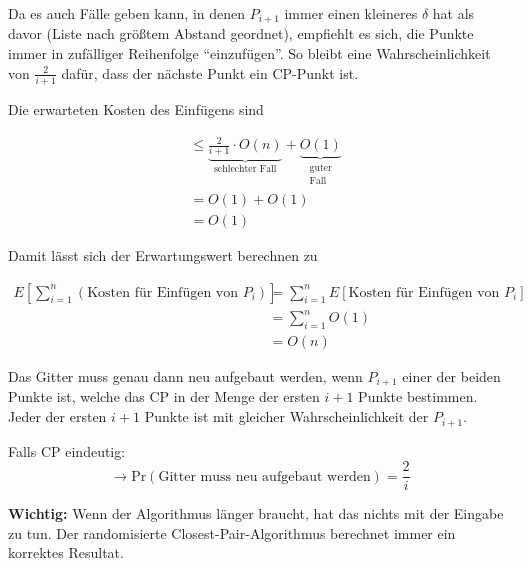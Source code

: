 \documentclass{scrartcl}%
\begin{document}
    Da es auch Fälle geben kann, in denen $P_{i+1}$ immer einen kleineres $\delta$ hat als davor
    (Liste nach größtem Abstand geordnet), empfiehlt es sich, die Punkte immer in zufälliger Reihenfolge "`einzufügen"'.
    So bleibt eine Wahrscheinlichkeit von $\frac{2}{i+1}$ dafür, dass der nächste Punkt ein CP-Punkt ist.

    Die erwarteten Kosten des Einfügens sind

    \begin{equation*}
        \begin{align*}
            & \leq \underbrace{\frac{2}{i+1} \cdot O(n)}_{\text{schlechter Fall}} + \underbrace{O(1)}_{\substack{\text{guter} \\ \text{Fall}}}\\\nonumber
            & = O(1) + O(1) \\\nonumber
            & = O(1)
        \end{align*}
    \end{equation*}

    \newpage
    Damit lässt sich der Erwartungswert berechnen zu

    \begin{equation*}
        \begin{align*}
            E\left[ \sum^{n}_{i=1}(\text{Kosten für Einfügen von }P_i)\right] &= \sum^{n}_{i=1}E[\text{Kosten für Einfügen von }P_i] \\\nonumber
            &= \sum^{n}_{i=1}O(1)\\\nonumber
            & = O(n)
        \end{align*}
    \end{equation*}

    {
    Das Gitter muss genau dann neu aufgebaut werden, wenn $P_{i+1}$
    einer der beiden Punkte ist, welche das CP in der Menge der ersten $i+1$ Punkte bestimmen.
    Jeder der ersten $i+1$ Punkte ist mit gleicher Wahrscheinlichkeit der $P_{i+1}$.

    Falls CP eindeutig:
    \begin{equation*}
        \rightarrow \text{Pr}(\text{Gitter muss neu aufgebaut werden}) = \frac{2}{i}
    \end{equation*}

    \textbf{\textsf{Wichtig:}} Wenn der Algorithmus länger braucht, hat das nichts mit der Eingabe zu tun.
    Der randomisierte Closest-Pair-Algorithmus berechnet immer ein korrektes Resultat.
    }
\end{document}
